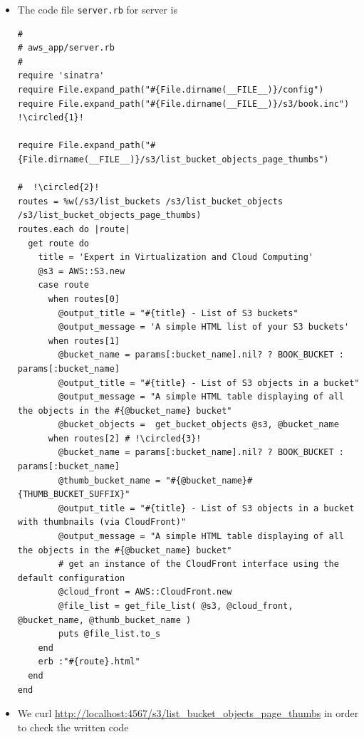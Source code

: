 \documentclass{beamer}
\newcommand*\circled[1]{\tikz[baseline=(char.base)]{
            \node[shape=circle,draw,inner sep=2pt] (char) {#1};}}
\begin{document}
\begin{frame}
\begin{itemize}
\item The code file \texttt{server.rb} for server is
\lstset{language=Ruby, style=eclipse}
\begin{lstlisting}[escapechar=!]
#
# aws_app/server.rb
#
require 'sinatra'
require File.expand_path("#{File.dirname(__FILE__)}/config")
require File.expand_path("#{File.dirname(__FILE__)}/s3/book.inc") !\circled{1}!

require File.expand_path("#{File.dirname(__FILE__)}/s3/list_bucket_objects_page_thumbs")

#  !\circled{2}!
routes = %w(/s3/list_buckets /s3/list_bucket_objects /s3/list_bucket_objects_page_thumbs)
routes.each do |route|
  get route do
    title = 'Expert in Virtualization and Cloud Computing'
    @s3 = AWS::S3.new
    case route
      when routes[0]
        @output_title = "#{title} - List of S3 buckets"
        @output_message = 'A simple HTML list of your S3 buckets'
      when routes[1]
        @bucket_name = params[:bucket_name].nil? ? BOOK_BUCKET : params[:bucket_name]
        @output_title = "#{title} - List of S3 objects in a bucket"
        @output_message = "A simple HTML table displaying of all the objects in the #{@bucket_name} bucket"
        @bucket_objects =  get_bucket_objects @s3, @bucket_name
      when routes[2] # !\circled{3}!
        @bucket_name = params[:bucket_name].nil? ? BOOK_BUCKET : params[:bucket_name]
        @thumb_bucket_name = "#{@bucket_name}#{THUMB_BUCKET_SUFFIX}"
        @output_title = "#{title} - List of S3 objects in a bucket with thumbnails (via CloudFront)"
        @output_message = "A simple HTML table displaying of all the objects in the #{@bucket_name} bucket"
        # get an instance of the CloudFront interface using the default configuration
        @cloud_front = AWS::CloudFront.new
        @file_list = get_file_list( @s3, @cloud_front, @bucket_name, @thumb_bucket_name )
        puts @file_list.to_s
    end
    erb :"#{route}.html"
  end
end

\end{lstlisting}

\item We curl \url{http://localhost:4567/s3/list\_bucket\_objects\_page\_thumbs} in order to check the written code
\end{itemize}
\end{frame}
\end{document}
